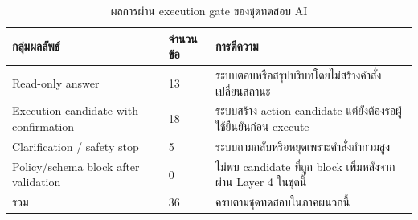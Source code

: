 \begin{table}[H]
    \centering
    \caption{ผลการผ่าน execution gate ของชุดทดสอบ AI}
    \label{tab:app_ai_execution_gate_summary}
    \renewcommand{\arraystretch}{1.18}
    \small
    \setlength{\tabcolsep}{3pt}
    \begin{tabular}{|L{0.34\textwidth}|L{0.16\textwidth}|L{0.40\textwidth}|}
        \hline
        \textbf{กลุ่มผลลัพธ์} & \textbf{จำนวนข้อ} & \textbf{การตีความ} \\ \hline
        Read-only answer & 13 & ระบบตอบหรือสรุปบริบทโดยไม่สร้างคำสั่งเปลี่ยนสถานะ \\ \hline
        Execution candidate with confirmation & 18 & ระบบสร้าง action candidate แต่ยังต้องรอผู้ใช้ยืนยันก่อน execute \\ \hline
        Clarification / safety stop & 5 & ระบบถามกลับหรือหยุดเพราะคำสั่งกำกวมสูง \\ \hline
        Policy/schema block after validation & 0 & ไม่พบ candidate ที่ถูก block เพิ่มหลังจากผ่าน Layer 4 ในชุดนี้ \\ \hline
        รวม & 36 & ครบตามชุดทดสอบในภาคผนวกนี้ \\ \hline
    \end{tabular}
\end{table}

